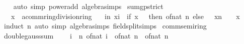 \begin{isabellebody}
\ \ \isamarkupfalse%
\ {\isacharparenleft}{\kern0pt}auto\ simp{\isacharcolon}{\kern0pt}\ power{\isacharunderscore}{\kern0pt}add\ algebra{\isacharunderscore}{\kern0pt}simps{\isacharparenright}{\kern0pt}%
\endisatagproof
{\isafoldproof}%
%
\isadelimproof
\isanewline
%
\endisadelimproof
\isanewline
{}\isamarkupfalse%
\ sum{\isacharunderscore}{\kern0pt}gp{\isacharunderscore}{\kern0pt}strict{\isacharcolon}{\kern0pt}\isanewline
\ \ \ x\ {\isacharcolon}{\kern0pt}{\isacharcolon}{\kern0pt}\ {\isachardoublequoteopen}{\isacharprime}{\kern0pt}a{\isacharcolon}{\kern0pt}{\isacharcolon}{\kern0pt}{\isacharbraceleft}{\kern0pt}comm{\isacharunderscore}{\kern0pt}ring{\isacharcomma}{\kern0pt}division{\isacharunderscore}{\kern0pt}ring{\isacharbraceright}{\kern0pt}{\isachardoublequoteclose}\isanewline
\ \ \ {\isachardoublequoteopen}{\isacharparenleft}{\kern0pt}{\isasymSum}i{\isacharless}{\kern0pt}n{\isachardot}{\kern0pt}\ x{\isacharcircum}{\kern0pt}i{\isacharparenright}{\kern0pt}\ {\isacharequal}{\kern0pt}\ {\isacharparenleft}{\kern0pt}if\ x\ {\isacharequal}{\kern0pt}\ {}\ then\ of{\isacharunderscore}{\kern0pt}nat\ n\ else\ {\isacharparenleft}{\kern0pt}{}\ {\isacharminus}{\kern0pt}\ x{\isacharcircum}{\kern0pt}n{\isacharparenright}{\kern0pt}\ {\isacharslash}{\kern0pt}\ {\isacharparenleft}{\kern0pt}{}\ {\isacharminus}{\kern0pt}\ x{\isacharparenright}{\kern0pt}{\isacharparenright}{\kern0pt}{\isachardoublequoteclose}\isanewline
%
\isadelimproof
\ \ %
\endisadelimproof
%
\isatagproof
{}\isamarkupfalse%
\ {\isacharparenleft}{\kern0pt}induct\ n{\isacharparenright}{\kern0pt}\ {\isacharparenleft}{\kern0pt}auto\ simp{\isacharcolon}{\kern0pt}\ algebra{\isacharunderscore}{\kern0pt}simps\ field{\isacharunderscore}{\kern0pt}split{\isacharunderscore}{\kern0pt}simps{\isacharparenright}{\kern0pt}%
\endisatagproof
{\isafoldproof}%
%
\isadelimproof
%
\endisadelimproof
%
\isadelimdocument
%
\endisadelimdocument
%
\isatagdocument
%
\isamarkuptrue%
%
\endisatagdocument
{\isafolddocument}%
%
\isadelimdocument
%
\endisadelimdocument
{}\isamarkupfalse%
\ comm{\isacharunderscore}{\kern0pt}semiring{\isacharunderscore}{\kern0pt}{}\isanewline
{}\isanewline
\isanewline
{}\isamarkupfalse%
\ double{\isacharunderscore}{\kern0pt}gauss{\isacharunderscore}{\kern0pt}sum{\isacharcolon}{\kern0pt}\isanewline
\ \ {\isachardoublequoteopen}{}\ {\isacharasterisk}{\kern0pt}\ {\isacharparenleft}{\kern0pt}{\isasymSum}i\ {\isacharequal}{\kern0pt}\ {}{\isachardot}{\kern0pt}{\isachardot}{\kern0pt}n{\isachardot}{\kern0pt}\ of{\isacharunderscore}{\kern0pt}nat\ i{\isacharparenright}{\kern0pt}\ {\isacharequal}{\kern0pt}\ of{\isacharunderscore}{\kern0pt}nat\ n\ {\isacharasterisk}{\kern0pt}\ {\isacharparenleft}{\kern0pt}of{\isacharunderscore}{\kern0pt}nat\ n\ {\isacharplus}{\kern0pt}\ {}{\isacharparenright}{\kern0pt}{\isachardoublequoteclose}\isanewline

\end{isabellebody}
